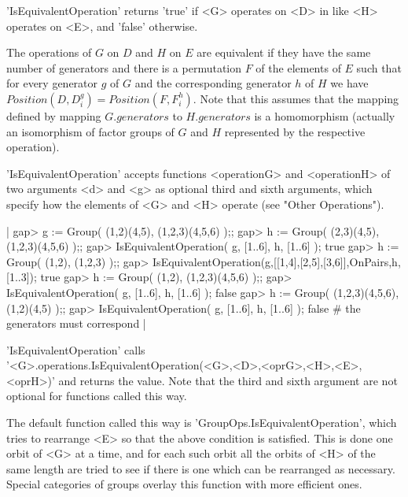 'IsEquivalentOperation' returns 'true' if <G> operates on <D> in like <H>
operates on <E>, and 'false' otherwise.

The operations of $G$ on $D$ and $H$  on $E$ are  equivalent if they have
the same  number of  generators  and there  is a   permutation $F$ of the
elements of   $E$  such that  for every   generator $g$ of   $G$  and the
corresponding generator  $h$ of  $H$ we  have   $Position(  D, D_i^g  ) =
Position( F, F_i^h )$.  Note that this  assumes that the  mapping defined
by mapping $G.generators$  to $H.generators$ is a  homomorphism (actually
an isomorphism  of  factor  groups of $G$   and  $H$ represented   by the
respective operation).

'IsEquivalentOperation' accepts functions   <operationG> and <operationH>
of two arguments <d> and <g> as optional third and sixth arguments, which
specify  how  the  elements  of   <G>  and  <H>  operate   (see    "Other
Operations").

|    gap> g := Group( (1,2)(4,5), (1,2,3)(4,5,6) );;
    gap> h := Group( (2,3)(4,5), (1,2,3)(4,5,6) );;
    gap> IsEquivalentOperation( g, [1..6], h, [1..6] );
    true
    gap> h := Group( (1,2), (1,2,3) );;
    gap> IsEquivalentOperation(g,[[1,4],[2,5],[3,6]],OnPairs,h,[1..3]);
    true
    gap> h := Group( (1,2), (1,2,3)(4,5,6) );;
    gap> IsEquivalentOperation( g, [1..6], h, [1..6] );
    false
    gap> h := Group( (1,2,3)(4,5,6), (1,2)(4,5) );;
    gap> IsEquivalentOperation( g, [1..6], h, [1..6] );
    false    # the generators must correspond |

'IsEquivalentOperation' calls \\
'<G>.operations.IsEquivalentOperation(<G>,<D>,<oprG>,<H>,<E>,<oprH>)' and
returns  the value.   Note that  the  third   and sixth argument are  not
optional for functions called this way.

The default function called this way is 'GroupOps.IsEquivalentOperation',
which tries to rearrange <E>  so that the above  condition  is satisfied.
This is done one orbit of <G> at a time, and for each such  orbit all the
orbits of <H> of the same length are tried to see  if there is  one which
can be rearranged  as necessary.  Special   categories of groups  overlay
this function with more efficient ones.




